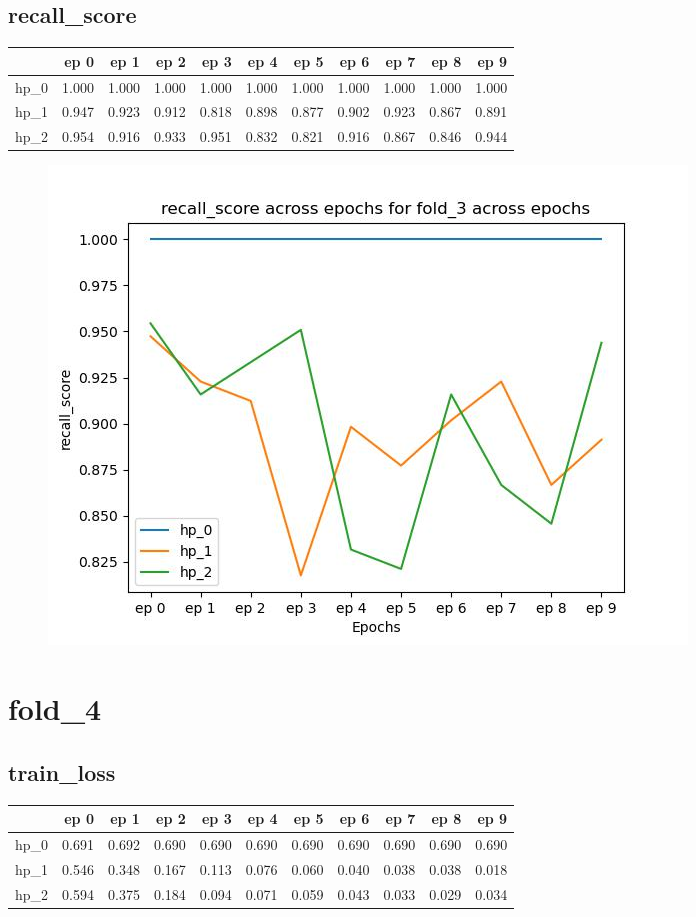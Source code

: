 \documentclass{article}
\begin{document}
\subsection{recall\_score}
\begin{tabular}{lrrrrrrrrrr}
\toprule
{} &   ep 0 &   ep 1 &   ep 2 &   ep 3 &   ep 4 &   ep 5 &   ep 6 &   ep 7 &   ep 8 &   ep 9 \\
\midrule
hp\_0 &  1.000 &  1.000 &  1.000 &  1.000 &  1.000 &  1.000 &  1.000 &  1.000 &  1.000 &  1.000 \\
hp\_1 &  0.947 &  0.923 &  0.912 &  0.818 &  0.898 &  0.877 &  0.902 &  0.923 &  0.867 &  0.891 \\
hp\_2 &  0.954 &  0.916 &  0.933 &  0.951 &  0.832 &  0.821 &  0.916 &  0.867 &  0.846 &  0.944 \\
\bottomrule
\end{tabular}

\begin{figure}[H]
\includegraphics[scale = 0.75]{fold_3/recall_score}
\end{figure}
\section{fold\_4}
\subsection{train\_loss}
\begin{tabular}{lrrrrrrrrrr}
\toprule
{} &   ep 0 &   ep 1 &   ep 2 &   ep 3 &   ep 4 &   ep 5 &   ep 6 &   ep 7 &   ep 8 &   ep 9 \\
\midrule
hp\_0 &  0.691 &  0.692 &  0.690 &  0.690 &  0.690 &  0.690 &  0.690 &  0.690 &  0.690 &  0.690 \\
hp\_1 &  0.546 &  0.348 &  0.167 &  0.113 &  0.076 &  0.060 &  0.040 &  0.038 &  0.038 &  0.018 \\
hp\_2 &  0.594 &  0.375 &  0.184 &  0.094 &  0.071 &  0.059 &  0.043 &  0.033 &  0.029 &  0.034 \\
\bottomrule
\end{tabular}
\end{document}

